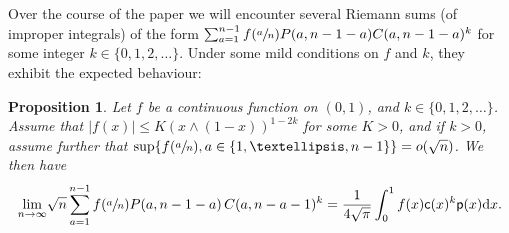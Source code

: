 \documentclass[11pt]{article}
\newcommand{\pp}{\mathsf{p}}
\newcommand{\dd}{\mathrm{d}}
\newtheorem{prop}[thm]{Proposition}
\theoremstyle{definition}
\begin{document}
Over the course of the paper we will encounter several Riemann sums (of improper integrals) of the form
$
\sum_{a=1}^{n-1} f(\sfrac{a}{n})P(a,n-1-a) C(a,n-1-a)^k
$ for some integer $k \in \{0,1,2,\dots \}$. Under some mild conditions on $f$ and $k$, they exhibit the expected behaviour:

\begin{prop}\label{prop:generalintegrallimit}
Let $f$ be a continuous function on $(0,1)$, and $k\in \{0,1,2, \dots \}$. Assume that $|f(x)|\leq K(x \wedge (1-x))^{1-2k}$ for some $K>0$, and if $k>0$, assume further that $\sup\{f(\sfrac{a}{n}),a\in\{1,\ldots,n-1\}\}=o(\sqrt{n})$. We then have
\begin{equation}\label{eq:limsumwithC}
\underset{n\to\infty}\lim\sqrt{n} \sum_{a=1}^{n-1} f{(\sfrac{a}{n})}P(a,n-1-a)\,C(a,n-a-1)^k = \frac{1}{4\sqrt{\pi}}\int_0^1 f(x)\ff(x)^k \pp(x) \dd x.
\end{equation}
\end{prop}
\end{document}
